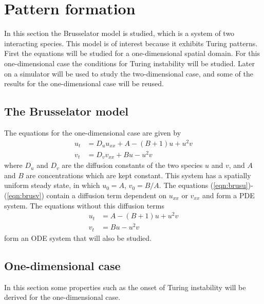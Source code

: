 \section{Pattern formation}\label{sec:patternformation}
In this section the Brusselator model is studied, which is a system of two interacting species. This model is of interest because it exhibits Turing patterns. 
\newline
\newline
First the equations will be studied for a one-dimensional spatial domain. For this one-dimensional case the conditions for Turing instability will be studied. 
\newline
\newline
Later on a simulator will be used to study the two-dimensional case, and some of the results for the one-dimensional case will be reused.
\subsection{The Brusselator model}
The equations for the one-dimensional case are given by
\begin{align}
u_t&=D_uu_{xx}+A-(B+1)u+u^2v \label{eqn:brusu}\\ 
v_t&=D_vv_{xx}+Bu-u^2v \label{eqn:brusv}
\end{align}
where $D_u$ and $D_v$ are the diffusion constants of the two species $u$ and $v$, and $A$ and $B$ are concentrations which are kept constant. This system has a spatially uniform steady state, in which $u_0=A$, $v_0=B/A$. The equations (\ref{eqn:brusu})-(\ref{eqn:brusv}) contain a diffusion term dependent on $u_{xx}$ or $v_{xx}$ and form a PDE system. The equations without this diffusion terms 
\begin{align}
u_t&=A-(B+1)u+u^2v \label{eqn:brusuode}\\ 
v_t&=Bu-u^2v \label{eqn:brusvode}
\end{align}
form an ODE system that will also be studied. 
\subsection{One-dimensional case}
In this section some properties such as the onset of Turing instability will be derived for the one-dimensional case.
